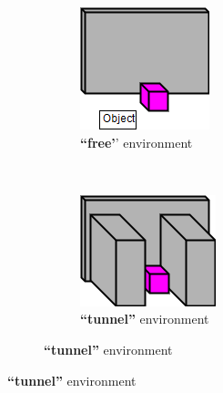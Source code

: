 \documentclass[12pt]{article}
\begin{document}
\begin{figure}
\begin{subfigure}[t]{0.45\columnwidth}
    \centering
    \begin{subfigure}[t]{0.45\columnwidth}
        \includegraphics[width=\textwidth]{images/FreeEnvironment.png}
        \caption{\textbf{``free'}' environment}
    \end{subfigure} \ \ \ \ \ \
    \begin{subfigure}[t]{0.45\columnwidth}
        \includegraphics[width=\textwidth]{images/TunnelEnvironment.png}
        \caption{\textbf{``tunnel''} environment}
    \end{subfigure}
    

\end{subfigure}
\end{figure}
\end{document}
